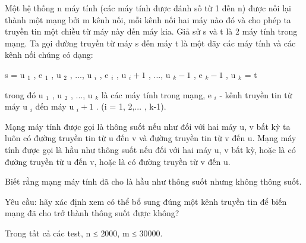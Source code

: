 Một hệ thống n máy tính (các máy tính được đánh số từ 1 đến n) được nối lại thành một mạng bởi m kênh nối, mỗi kênh nối hai máy nào đó và cho phép ta truyền tin một chiều từ máy này đến máy kia. Giả sử s và t là 2 máy tính trong mạng. Ta gọi đường truyền từ máy s đến máy t là một dãy các máy tính và các kênh nối chúng có dạng:  

   s = u   $_    1   $   , e   $_    1   $   , u   $_    2   $   , ..., u   $_    i   $   , e   $_    i   $   , u   $_    i+1   $   , ..., u   $_    k-1   $   , e   $_    k-1   $   , u   $_    k   $   = t  

   trong đó u   $_    1   $   , u   $_    2   $   , ..., u   $_    k   $   là các máy tính trong mạng, e   $_    i   $   - kênh truyền tin từ máy u   $_    i   $   đến máy u   $_    i+1   $   . (i = 1, 2,... , k-1).  

   Mạng máy tính được gọi là thông suốt nếu như đối với hai máy u, v bất kỳ ta luôn có đường truyền tin từ u đến v và đường truyền tin từ v đến u. Mạng máy tính được gọi là hầu như thông suốt nếu đối với hai máy u, v bất kỳ, hoặc là có đường truyền từ u đến v, hoặc là có đường truyền từ v đến u.  

   Biết rằng mạng máy tính đã cho là hầu như thông suốt nhưng không thông suốt.  

   Yêu cầu: hãy xác định xem có thể bổ sung đúng một kênh truyền tin để biến mạng đã cho trở thành thông suốt được không?  

Trong tất cả các test, n ≤ 2000, m ≤ 30000.